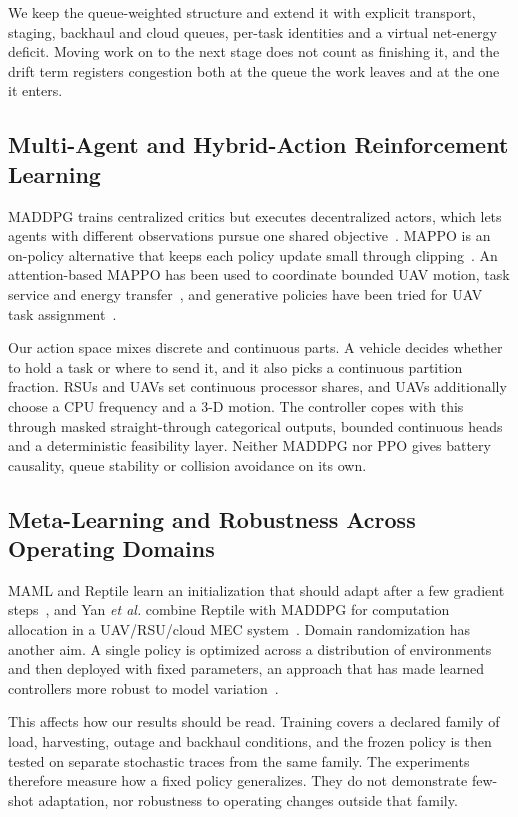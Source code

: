 We keep the queue-weighted structure and extend it with explicit transport,
staging, backhaul and cloud queues, per-task identities and a virtual
net-energy deficit. Moving work on to the next stage does not count as
finishing it, and the drift term registers congestion both at the queue the
work leaves and at the one it enters.

\subsection{Multi-Agent and Hybrid-Action Reinforcement Learning}
MADDPG trains centralized critics but executes decentralized actors, which
lets agents with different observations pursue one shared
objective~\cite{lowe2017multi}. MAPPO is an on-policy alternative that keeps
each policy update small through clipping~\cite{schulman2017proximal}. An
attention-based MAPPO has been used to coordinate bounded UAV motion, task
service and energy transfer~\cite{talukdar2026mappo}, and generative policies
have been tried for UAV task assignment~\cite{tang2025dnn}.

Our action space mixes discrete and continuous parts. A vehicle decides
whether to hold a task or where to send it, and it also picks a continuous
partition fraction. RSUs and UAVs set continuous processor shares, and UAVs
additionally choose a CPU frequency and a 3-D motion. The controller copes
with this through masked straight-through categorical outputs, bounded
continuous heads and a deterministic feasibility layer. Neither MADDPG nor
PPO gives battery causality, queue stability or collision avoidance on its
own.

\subsection{Meta-Learning and Robustness Across Operating Domains}
MAML and Reptile learn an initialization that should adapt after a few
gradient steps~\cite{finn2017model,nichol2018reptile}, and Yan \emph{et al.}
combine Reptile with MADDPG for computation allocation in a UAV/RSU/cloud MEC
system~\cite{yan2026rmaddpg}. Domain randomization has another aim. A single
policy is optimized across a distribution of environments and then deployed
with fixed parameters, an approach that has made learned controllers more
robust to model variation~\cite{tobin2017domain,peng2018sim}.

This affects how our results should be read. Training covers a declared
family of load, harvesting, outage and backhaul conditions, and the frozen
policy is then tested on separate stochastic traces from the same family. The
experiments therefore measure how a fixed policy generalizes. They do not
demonstrate few-shot adaptation, nor robustness to operating changes outside
that family.

